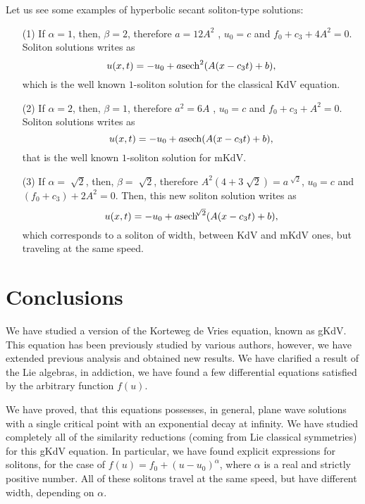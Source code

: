 \documentclass[
11pt,%
tightenlines,%
twoside,%
onecolumn,%
nofloats,%
nobibnotes,%
nofootinbib,%
superscriptaddress,%
noshowpacs,%
centertags]%
{revtex4}
\begin{document}
Let us see some examples of hyperbolic secant soliton-type solutions:

\begin{itemize}
\item[(1)] If  $\alpha = 1$, then, $\beta =2$, therefore $a=12A^2$ , $ u_{0}=c$  and $f_{0}+c_{3}+4A^2=0$. Soliton solutions writes as
\begin{equation}
u(x,t) = -u_0+a {\rm sech}^2 (A(x-c_3t)+b),
\end{equation}
which is the well known $1$-soliton solution for the classical KdV equation.

\item[(2)] If  $\alpha = 2$, then, $\beta =1$, therefore $a^2=6A$ , $ u_{0}=c$  and $f_{0}+c_{3}+A^2=0$. Soliton solutions writes as
\begin{equation}
u(x,t) = -u_0+a{\rm sech} (A(x-c_3t)+b),
\end{equation}
that is the well known $1$-soliton solution for mKdV.
   
 \item[(3)]  If  $\alpha = \sqrt[]{2}$, then, $\beta =\sqrt[]{2}$, therefore $A^2(4+3\sqrt[]{2})=a^{\sqrt[]{2}}$, $ u_{0}=c$ and $(f_{0}+c_{3})+2A^2=0$.
Then, this new soliton solution writes as
\begin{equation}
u(x,t) = -u_0+a {\rm sech}^{\sqrt[]{2}}(A(x-c_3t)+b), 
\end{equation}
which corresponds to a soliton of width, between KdV and mKdV ones, but traveling at the same speed.
\end{itemize}

\section{Conclusions}

We have studied a version of the Korteweg de Vries equation, known as gKdV. This equation has been previously studied by various authors, however, we have extended previous analysis and obtained new results. We have clarified a result of the Lie algebras, in addiction, we have found a few differential equations satisfied by the arbitrary function $f(u)$. 

We have proved, that this equations possesses, in general, plane wave solutions with a single critical point with an exponential decay at infinity. We have studied completely all of the similarity reductions (coming from Lie classical symmetries) for this gKdV equation. In particular, we have found explicit expressions for solitons, for the case of $f(u) = f_0 + (u-u_0)^\alpha$, where $\alpha$ is a real and strictly positive number. All of these solitons travel at the same speed, but have different width, depending on $\alpha$.
\end{document}
